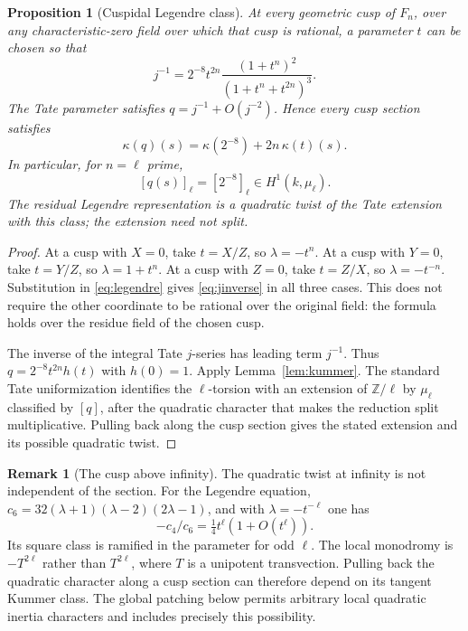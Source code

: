 \documentclass[11pt,a4paper]{article}
\newcommand{\Z}{\mathbb Z}
\theoremstyle{plain}
\newtheorem{proposition}[theorem]{Proposition}
\theoremstyle{definition}
\newtheorem{remark}[theorem]{Remark}
\begin{document}
\begin{proposition}[Cuspidal Legendre class]\label{prop:cusp-class}
At every geometric cusp of $F_n$, over any characteristic-zero field
over which that cusp is rational, a parameter $t$ can be chosen so that
\begin{equation}\label{eq:jinverse}
 j^{-1}=2^{-8}t^{2n}
       \frac{(1+t^n)^2}{(1+t^n+t^{2n})^3}.
\end{equation}
The Tate parameter satisfies $q=j^{-1}+O(j^{-2})$. Hence every cusp
section satisfies
\[
 \kappa(q)(s)=\kappa(2^{-8})+2n\,\kappa(t)(s).
\]
In particular, for $n=\ell$ prime,
\begin{equation}\label{eq:cuspresidual}
 [q(s)]_\ell=[2^{-8}]_\ell\in H^1(k,\mu_\ell).
\end{equation}
The residual Legendre representation is a quadratic twist of the Tate
extension with this class; the extension need not split.
\end{proposition}
\begin{proof}
At a cusp with $X=0$, take $t=X/Z$, so $\lambda=-t^n$.
At a cusp with $Y=0$, take $t=Y/Z$, so $\lambda=1+t^n$.
At a cusp with $Z=0$, take $t=Z/X$, so $\lambda=-t^{-n}$.
Substitution in \eqref{eq:legendre} gives \eqref{eq:jinverse} in all
three cases. This does not require the other coordinate to be rational
over the original field: the formula holds over the residue field of
the chosen cusp.

The inverse of the integral Tate $j$-series has leading term $j^{-1}$.
Thus $q=2^{-8}t^{2n}h(t)$ with $h(0)=1$. Apply
Lemma~\ref{lem:kummer}. The standard Tate uniformization identifies
the $\ell$-torsion with an extension of $\Z/\ell$ by $\mu_\ell$
classified by $[q]$, after the quadratic character that makes the
reduction split multiplicative. Pulling back along the cusp section
gives the stated extension and its possible quadratic twist.
\end{proof}

\begin{remark}[The cusp above infinity]\label{rem:infinity}
The quadratic twist at infinity is not independent of the section.
For the Legendre equation,
$c_6=32(\lambda+1)(\lambda-2)(2\lambda-1)$, and with
$\lambda=-t^{-\ell}$ one has
\[
 -c_4/c_6=\tfrac14t^\ell(1+O(t^\ell)).
\]
Its square class is ramified in the parameter for odd $\ell$.
The local monodromy is $-T^{2\ell}$ rather than $T^{2\ell}$, where
$T$ is a unipotent transvection. Pulling back the quadratic character
along a cusp section can therefore depend on its tangent Kummer class.
The global patching below permits arbitrary local quadratic inertia
characters and includes precisely this possibility.
\end{remark}
\end{document}
